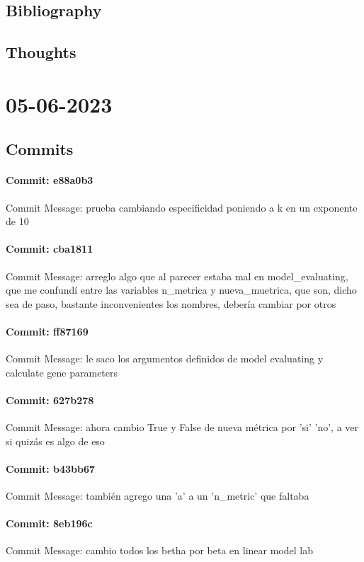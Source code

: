 \documentclass{article}
\begin{document}
\subsection{Bibliography}
\subsection{Thoughts}

\section{05-06-2023}
\subsection{Commits}
\paragraph{Commit: e88a0b3}
Commit Message: prueba cambiando especificidad poniendo a k en un exponente de 10

\paragraph{Commit: cba1811}
Commit Message: arreglo algo que al parecer estaba mal en model_evaluating, que me confundí entre las variables n_metrica y nueva_muetrica, que son, dicho sea de paso, bastante inconvenientes los nombres, debería cambiar por otros

\paragraph{Commit: ff87169}
Commit Message: le saco los argumentos definidos de model evaluating y calculate gene parameters

\paragraph{Commit: 627b278}
Commit Message: ahora cambio True y False de nueva métrica por 'si' 'no', a ver si quizás es algo de eso

\paragraph{Commit: b43bb67}
Commit Message: también agrego una 'a' a un 'n_metric' que faltaba

\paragraph{Commit: 8eb196c}
Commit Message: cambio todos los betha por beta en linear model lab
\end{document}
